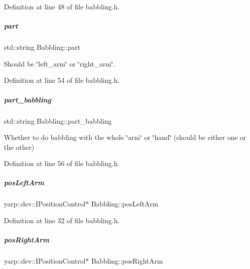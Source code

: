 Definition at line 48 of file babbling.\+h.

\mbox{\label{group__babbling_a677602f878f4403e2ad99091c86f29a6}} 
\subparagraph{\texorpdfstring{part}{part}}
{\footnotesize\ttfamily std\+::string Babbling\+::part\hspace{0.3cm}{\ttfamily [protected]}}



Should be \char`\"{}left\+\_\+arm\char`\"{} or \char`\"{}right\+\_\+arm\char`\"{}. 



Definition at line 54 of file babbling.\+h.

\mbox{\label{group__babbling_aa881d448117e515a051b8385532c3578}} 
\subparagraph{\texorpdfstring{part\+\_\+babbling}{part\_babbling}}
{\footnotesize\ttfamily std\+::string Babbling\+::part\+\_\+babbling\hspace{0.3cm}{\ttfamily [protected]}}



Whether to do babbling with the whole \char`\"{}arm\char`\"{} or \char`\"{}hand\char`\"{} (should be either one or the other) 



Definition at line 56 of file babbling.\+h.

\mbox{\label{group__babbling_ae3f0e78b0005659b56d4aabc7868c9a9}} 
\subparagraph{\texorpdfstring{pos\+Left\+Arm}{posLeftArm}}
{\footnotesize\ttfamily yarp\+::dev\+::\+I\+Position\+Control$\ast$ Babbling\+::pos\+Left\+Arm\hspace{0.3cm}{\ttfamily [protected]}}



Definition at line 32 of file babbling.\+h.

\mbox{\label{group__babbling_abddc746bc2eae62a162fc48cdc5f5553}} 
\subparagraph{\texorpdfstring{pos\+Right\+Arm}{posRightArm}}
{\footnotesize\ttfamily yarp\+::dev\+::\+I\+Position\+Control$\ast$ Babbling\+::pos\+Right\+Arm\hspace{0.3cm}{\ttfamily [protected]}}



